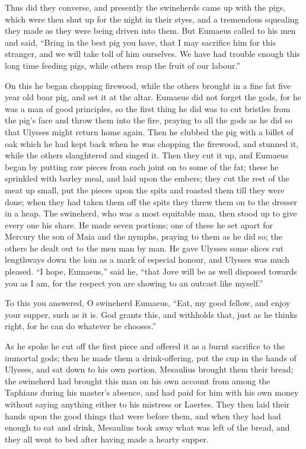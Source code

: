 Thus did they converse, and presently the swineherds came up with the pigs,
which were then shut up for the night in their styes, and a tremendous
squealing they made as they were being driven into them. But Eumaeus called to
his men and said, “Bring in the best pig you have, that I may sacrifice him for
this stranger, and we will take toll of him ourselves. We have had trouble
enough this long time feeding pigs, while others reap the fruit of our labour.”

On this he began chopping firewood, while the others brought in a fine fat five
year old boar pig, and set it at the altar. Eumaeus did not forget the gods,
for he was a man of good principles, so the first thing he did was to cut
bristles from the pig’s face and throw them into the fire, praying to all the
gods as he did so that Ulysses might return home again. Then he clubbed the pig
with a billet of oak which he had kept back when he was chopping the firewood,
and stunned it, while the others slaughtered and singed it. Then they cut it
up, and Eumaeus began by putting raw pieces from each joint on to some of the
fat; these he sprinkled with barley meal, and laid upon the embers; they cut
the rest of the meat up small, put the pieces upon the spits and roasted them
till they were done; when they had taken them off the spits they threw them on
to the dresser in a heap. The swineherd, who was a most equitable man, then
stood up to give every one his share. He made seven portions; one of these he
set apart for Mercury the son of Maia and the nymphs, praying to them as he did
so; the others he dealt out to the men man by man. He gave Ulysses some slices
cut lengthways down the loin as a mark of especial honour, and Ulysses was much
pleased. “I hope, Eumaeus,” said he, “that Jove will be as well disposed
towards you as I am, for the respect you are showing to an outcast like
myself.”

To this you answered, O swineherd Eumaeus, “Eat, my good fellow, and enjoy your
supper, such as it is. God grants this, and withholds that, just as he thinks
right, for he can do whatever he chooses.”

As he spoke he cut off the first piece and offered it as a burnt sacrifice to
the immortal gods; then he made them a drink-offering, put the cup in the hands
of Ulysses, and sat down to his own portion. Mesaulius brought them their
bread; the swineherd had brought this man on his own account from among the
Taphians during his master’s absence, and had paid for him with his own money
without saying anything either to his mistress or Laertes. They then laid their
hands upon the good things that were before them, and when they had had enough
to eat and drink, Mesaulius took away what was left of the bread, and they all
went to bed after having made a hearty supper.

